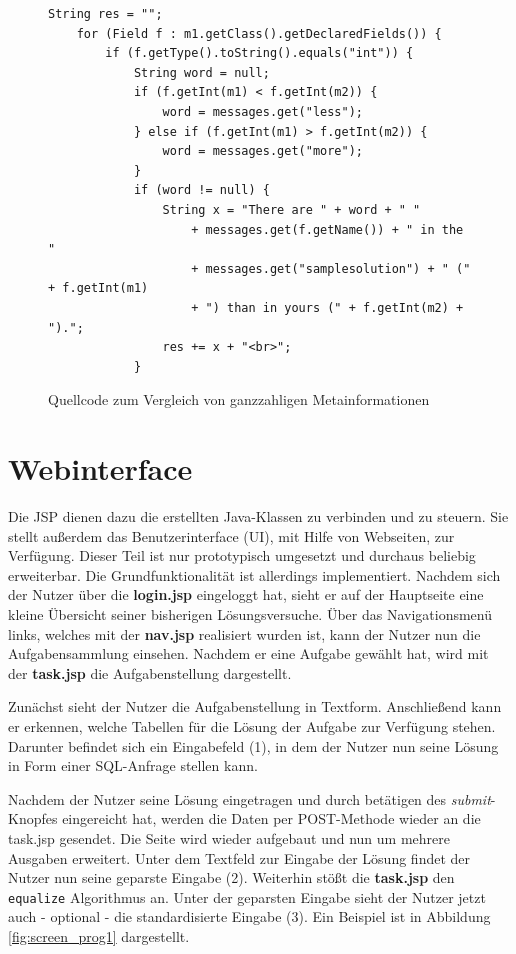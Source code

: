 \begin{figure}[h]
\lstset{language=Java,tabsize=2}
\begin{lstlisting}
String res = "";
	for (Field f : m1.getClass().getDeclaredFields()) {
		if (f.getType().toString().equals("int")) {
			String word = null;
			if (f.getInt(m1) < f.getInt(m2)) {
				word = messages.get("less");
			} else if (f.getInt(m1) > f.getInt(m2)) {
				word = messages.get("more");
			}
			if (word != null) {
				String x = "There are " + word + " "
					+ messages.get(f.getName()) + " in the "
					+ messages.get("samplesolution") + " (" + f.getInt(m1)
					+ ") than in yours (" + f.getInt(m2) + ").";
				res += x + "<br>";
			}
\end{lstlisting}
\caption{Quellcode zum Vergleich von ganzzahligen Metainformationen}
\label{fig:comparecode}
\end{figure}

\section{Webinterface}

Die JSP dienen dazu die erstellten Java-Klassen zu verbinden und zu steuern. Sie stellt außerdem das Benutzerinterface (UI), mit Hilfe von Webseiten, zur Verfügung. Dieser Teil ist nur prototypisch umgesetzt und durchaus beliebig erweiterbar. Die Grundfunktionalität ist allerdings implementiert. Nachdem sich der Nutzer über die \textbf{login.jsp} eingeloggt hat, sieht er auf der Hauptseite eine kleine Übersicht seiner bisherigen Lösungsversuche. Über das Navigationsmenü links, welches mit der \textbf{nav.jsp} realisiert wurden ist, kann der Nutzer nun die Aufgabensammlung einsehen. Nachdem er eine Aufgabe gewählt hat, wird mit der \textbf{task.jsp} die Aufgabenstellung dargestellt.

Zunächst sieht der Nutzer die Aufgabenstellung in Textform. Anschließend kann er erkennen, welche Tabellen für die Lösung der Aufgabe zur Verfügung stehen. Darunter befindet sich ein Eingabefeld (1), in dem der Nutzer nun seine Lösung in Form einer SQL-Anfrage stellen kann.

Nachdem der Nutzer seine Lösung eingetragen und durch betätigen des \textit{submit}-Knopfes eingereicht hat, werden die Daten per POST-Methode wieder an die task.jsp gesendet. Die Seite wird wieder aufgebaut und nun um mehrere Ausgaben erweitert. Unter dem Textfeld zur Eingabe der Lösung findet der Nutzer nun seine geparste Eingabe (2). Weiterhin stößt die \textbf{task.jsp} den \verb|equalize| Algorithmus an. Unter der geparsten Eingabe sieht der Nutzer jetzt auch - optional - die standardisierte Eingabe (3). Ein Beispiel ist in Abbildung \ref{fig:screen_prog1} dargestellt.

